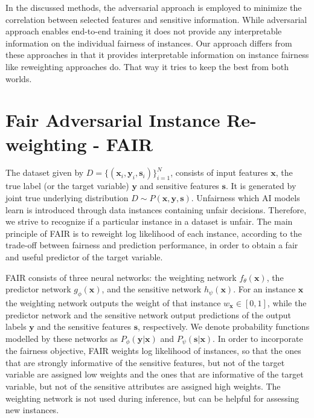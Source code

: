 \documentclass[preprint,12pt]{elsarticle}
\begin{document}
In the discussed methods, the adversarial approach is employed to minimize the correlation between selected features and sensitive information. While adversarial approach enables end-to-end training it does not provide any interpretable information on the individual fairness of instances. Our approach differs from these approaches in that it provides interpretable information on instance fairness like reweighting approaches do. That way it tries to keep the best from both worlds.

\section{Fair Adversarial Instance Re-weighting - FAIR}
\label{Sec:FAIR}

The dataset given by $D=\{(\mathbf{x}_i, \mathbf{y}_i, \mathbf{s}_i) \}_{i=1}^N$, consists of input features $\mathbf{x}$, the true label (or the target variable) $\mathbf{y}$ and sensitive features $\mathbf{s}$. It is generated by joint true underlying distribution $D \sim P(\mathbf{x},\mathbf{y},\mathbf{s})$. Unfairness which AI models learn is introduced through data instances containing unfair decisions. Therefore, we strive to recognize if a particular instance in a dataset is unfair. The main principle of FAIR is to reweight log likelihood of each instance, according to the trade-off between fairness and prediction performance, in order to obtain a fair and useful predictor of the target variable.

FAIR consists of three neural networks: the weighting network $f_\theta(\mathbf{x})$, the predictor network $g_\phi(\mathbf{x})$, and the sensitive network $h_\psi(\mathbf{x})$.
For an instance $\mathbf{x}$ the weighting network outputs the weight of that instance $w_\mathbf{x}\in[0,1]$, while the predictor network and the sensitive network output predictions of the output labels $\mathbf{y}$ and the sensitive features $\mathbf{s}$, respectively. We denote probability functions modelled by these networks as $P_\phi(\mathbf{y}|\mathbf{x})$ and $P_\psi(\mathbf{s}|\mathbf{x})$.
In order to incorporate the fairness objective, FAIR weights log likelihood of instances, so that the ones that are strongly informative of the sensitive features, but not of the target variable are assigned low weights and the ones that are informative of the target variable, but not of the sensitive attributes are assigned high weights.
The weighting network is not used during inference, but can be helpful for assessing new instances.
\end{document}
